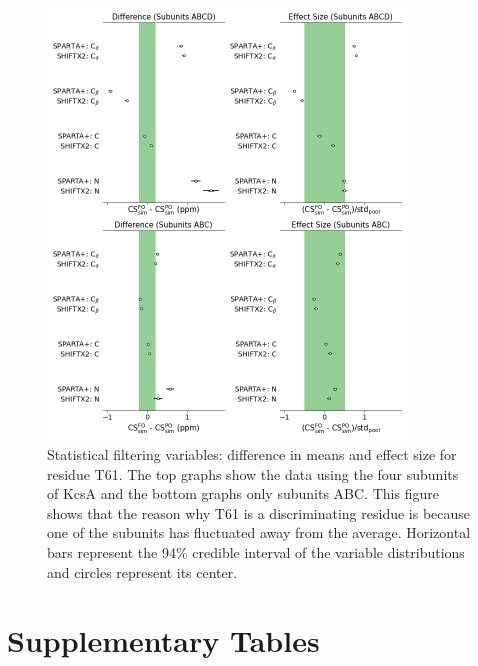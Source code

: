 \documentclass[%
 aip,
 amsmath,amssymb,
 preprint,%
]{revtex4-1}
\begin{document}
\clearpage
\begin{figure}[tbp]
	\includegraphics[width=0.85\textwidth]{figures_SI/statistical_filtering_skew_model_shiftx2_T61.png}
	 \caption{\scriptsize
Statistical filtering variables: difference in means and effect size for residue T61. The top graphs show the data using the four subunits of KcsA and the bottom graphs only subunits ABC. This figure shows that the reason why T61 is a discriminating residue is because one of the subunits has fluctuated away from the average. Horizontal bars represent the 94\% credible interval of the variable distributions and circles represent its center. 
}
\label{SI_stat_filt_T61}
\end{figure}


\clearpage
\section{Supplementary Tables}
\end{document}
